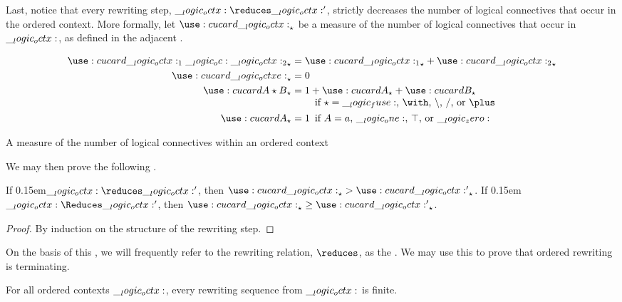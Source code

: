 Last, notice that every rewriting step, $\octx \reduces \octx'$, strictly decreases the number of logical connectives that occur in the ordered context.
More formally, let $\card{\octx}_{\star}$ be a measure of the number of logical connectives that occur in $\__logic_octx:$, as defined in the adjacent .
%
\begin{marginfigure}
  \begin{align*}
    \card{\octx_1 \oc \octx_2}_{\star} &= \card{\octx_1}_{\star} + \card{\octx_2}_{\star} \\
    \card{\octxe}_{\star} &= 0 \\
    \card{A \star B}_{\star} &= \begin{tabular}[t]{@{}l@{}}
                          $1 + \card{A}_{\star} + \card{B}_{\star}$ \\
                          \quad if $\mathord{\star} = \mathord{\fuse}$, $\mathord{\with}$, $\mathord{\limp}$, $\mathord{\pmir}$, or $\mathord{\plus}$
                         \end{tabular} \\
    \card{A}_{\star} &= \mathrlap{1}
                    \quad \text{if $A = a$, $\one$, $\top$, or $\zero$}
  \end{align*}
  \caption{A measure of the number of logical connectives within an ordered context}\label{fig:ordered-rewriting:measure}
\end{marginfigure}%
%
We may then prove the following .%
%
\begin{lemma}\label{lem:ordered-rewriting:reduction}
  If \kern0.15em$\octx \reduces \octx'$, then $\card{\octx}_{\star} > \card{\octx'}_{\star}$.
  If \kern0.15em$\octx \Reduces \octx'$, then $\card{\octx}_{\star} \geq \card{\octx'}_{\star}$.
\end{lemma}
%
\begin{proof}
  By induction on the structure of the rewriting step.
\end{proof}
%
\noindent
On the basis of this , we will frequently refer to the rewriting relation, $\reduces$, as the .
We may use this  to prove that ordered rewriting is terminating.
% 
%
\begin{theorem}[Termination]\label{thm:ordered-rewriting:termination}
  For all ordered contexts $\__logic_octx:$, every rewriting sequence from $\__logic_octx:$ is finite.
\end{theorem}
